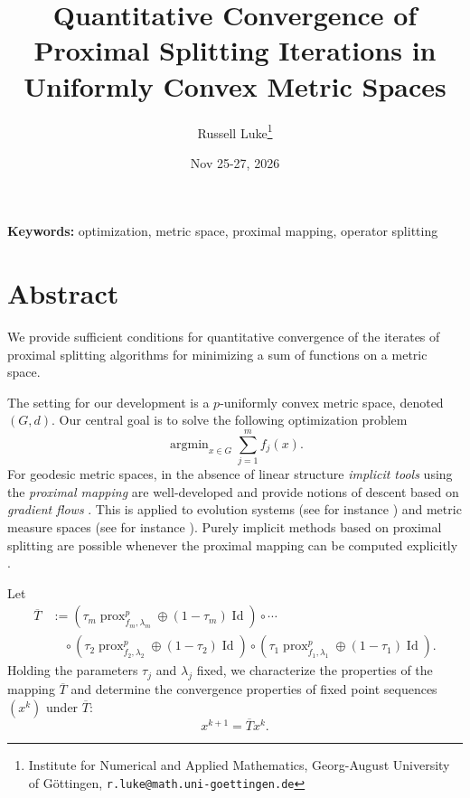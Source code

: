 \documentclass[11pt]{article}
\title{\bfseries Quantitative Convergence of Proximal Splitting Iterations in Uniformly Convex Metric Spaces}
\author{
Russell Luke\thanks{Institute for Numerical and Applied Mathematics, Georg-August University of Göttingen,
\texttt{r.luke@math.uni-goettingen.de}}
}
\date{Nov 25-27, 2026}
\DeclareMathOperator*{\argmin}{argmin}
\DeclareMathOperator{\prox}{prox}
\DeclareMathOperator{\Id}{Id}
\newcommand{\Tbar}{{\overline{T}}}
\renewcommand{\equiv}{:=}
\begin{document}
\maketitle

\vspace{-1em}

\noindent
\textbf{Keywords:}
optimization, metric space, proximal mapping, operator splitting

\vspace{0.5em}


\vspace{1em}

\section*{Abstract}
We provide sufficient conditions for quantitative
convergence of the iterates of proximal splitting algorithms for minimizing a sum of functions on a metric space.

The setting for our development is a $p$-uniformly convex metric space, denoted $(G,d)$.
Our central goal is to solve the following optimization problem
 \begin{equation}\label{eq:gen prob}
     \argmin_{x\in G} \sum_{j=1}^m f_j(x).
 \end{equation}
For geodesic metric spaces, in the absence of linear structure {\em implicit tools}
using the {\em proximal mapping} \cite{Jost1995}
are well-developed and provide notions of descent based on  {\em gradient flows} \cite{DeGMarTos80, AmbGigSav2005}.
This is applied to evolution systems (see for instance \cite{GigNob21}) and metric measure spaces (see for instance \cite{OhtaPal15}).
Purely implicit methods based on proximal splitting are possible whenever the proximal mapping can be computed
explicitly \cite{Bacak14, LauLuk21, BLL, LukMir26}.

Let
\begin{equation}
\begin{aligned}
\Tbar &\equiv (\tau_m \prox^p_{f_m,\lambda_m} \oplus (1 - \tau_m)\Id)  \circ \cdots \nonumber \\
  &\quad \circ (\tau_2 \prox^p_{f_2,\lambda_2} \oplus (1 - \tau_2)\Id)
    \circ (\tau_1 \prox^p_{f_1,\lambda_1} \oplus (1 - \tau_1)\Id).
\end{aligned}
\end{equation}
Holding the parameters $\tau_j$ and $\lambda_j$ fixed, we characterize the properties of the mapping $\Tbar$ and
determine the convergence properties of fixed point sequences $(x^k)$ under $\Tbar$:
\[
 x^{k+1}= \overline{T} x^k.
\]
\end{document}

